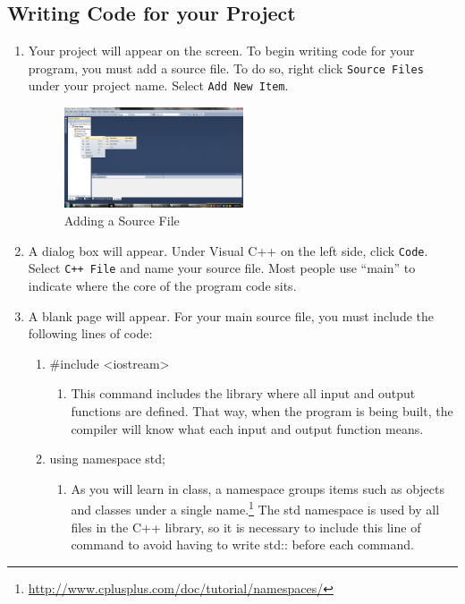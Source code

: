\documentclass[twocolumn]{article}
\begin{document}
\subsection{Writing Code for your Project}
\begin{enumerate}
	\item Your project will appear on the screen. To begin writing code for your program, you must add a source file. To do so, right click \texttt{Source Files} under your project name. Select \texttt{Add New Item}. 	
		\begin{figure}[htbp]
		\centering
		\includegraphics[width=0.5\textwidth]{3.png}
		\caption{Adding a Source File}
		\label{fig:sourcefile}
	\end{figure}
	\item A dialog box will appear. Under Visual C++ on the left side, click \texttt{Code}. Select \texttt{C++ File} and name your source file. Most people use “main” to indicate where the core of the program code sits. 
	\item A blank page will appear. For your main source file, you must include the following lines of code:
	\begin{enumerate}
		\item #include <iostream>
	\begin{enumerate}
	  \item This command includes the library where all input and output functions are defined. That way, when the program is being built, the compiler will know what each input and output function means.
	\end{enumerate}	
	  \item using namespace std;
	\begin{enumerate}
	  \item As you will learn in class, a namespace groups items such as objects and classes under a single name.\footnote{\url{http://www.cplusplus.com/doc/tutorial/namespaces/}} The std namespace is used by all files in the C++ library, so it is necessary to include this line of command to avoid having to write std:: before each command.
	\end{enumerate}

\end{enumerate}
\end{enumerate}
\end{document}
